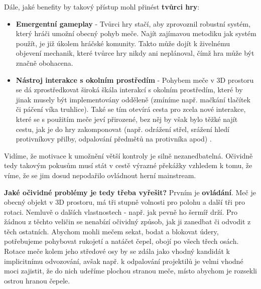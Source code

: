 Dále, jaké benefity by takový přístup mohl přinést \textbf{tvůrci hry}:
\begin{itemize}
    \item \textbf{Emergentní gameplay} - Tvůrci hry stačí, aby zprovoznil robustní systém, který hráči umožní obecný pohyb meče. Najít zajímavou metodiku jak systém použít, je již úkolem hráčské komunity. Takto může dojít k živelnému objevení mechanik, které tvůrce hry nikdy ani neplánoval, čímž hra může být značně obohacena.  
    \item \textbf{Nástroj interakce s okolním prostředím} - Pohybem meče v 3D prostoru se dá zprostředkovat široká škála interakcí s okolním prostředím, které by jinak musely být implementovány odděleně (zmíníme např. mačkání tlačítek či páčení víka truhlice). Také se tím otevírá cesta pro zcela nové interakce, které se s použitím meče jeví přirozené, bez něj by však bylo těžké najít cestu, jak je do hry zakomponovat (např. odrážení střel, srážení hledí protivníkovy přilby, odpalování předmětů na protivníka apod) .   
\end{itemize}

Vidíme, že motivace k umožnění větší kontroly je silně nezanedbatelná. Očividně tedy takovým pokusům musí stát v cestě výrazné překážky vzhledem k tomu, že víme, že se jim dosud nepodařilo ovládnout herní mainstream.

\textbf{Jaké očividné problémy je tedy třeba vyřešit?}
\bigbreak
Prvním je \textbf{ovládání}. Meč je obecný objekt v 3D prostoru, má tři stupně volnosti pro polohu a další tři pro rotaci. Nemluvě o dalších vlastnostech - např. jak pevně ho šermíř drží. Pro žádnou z těchto veličin se nenabízí očividný způsob, jak ji zanedbat či odvodit z těch ostatních. Abychom mohli mečem sekat, bodat a blokovat údery, potřebujeme pohybovat rukojetí a natáčet čepel, obojí po všech třech osách. Rotace meče kolem jeho středové osy by se zdála jako vhodný kandidát k implicitnímu odvozování, avšak např. k odpalování projektilů je velmi vhodné moci zajistit, že do nich udeříme plochou stranou meče, místo abychom je rozsekli ostrou hranou čepele.

